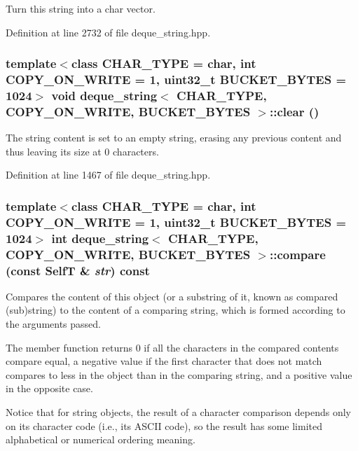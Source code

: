 Turn this string into a char vector. 

Definition at line 2732 of file deque\_\-string.hpp.\hypertarget{classdeque__string_4ee86cce5b0bdf35309bcdf0e1cee4e5}{
\subsubsection[{clear}]{\setlength{\rightskip}{0pt plus 5cm}template$<$class CHAR\_\-TYPE  = char, int COPY\_\-ON\_\-WRITE = 1, uint32\_\-t BUCKET\_\-BYTES = 1024$>$ void {\bf deque\_\-string}$<$ CHAR\_\-TYPE, COPY\_\-ON\_\-WRITE, BUCKET\_\-BYTES $>$::clear ()}}
\label{classdeque__string_4ee86cce5b0bdf35309bcdf0e1cee4e5}


The string content is set to an empty string, erasing any previous content and thus leaving its size at 0 characters. 

Definition at line 1467 of file deque\_\-string.hpp.\hypertarget{classdeque__string_703af7d90146d6f0589d5a778e488ebf}{
\subsubsection[{compare}]{\setlength{\rightskip}{0pt plus 5cm}template$<$class CHAR\_\-TYPE  = char, int COPY\_\-ON\_\-WRITE = 1, uint32\_\-t BUCKET\_\-BYTES = 1024$>$ int {\bf deque\_\-string}$<$ CHAR\_\-TYPE, COPY\_\-ON\_\-WRITE, BUCKET\_\-BYTES $>$::compare (const {\bf SelfT} \& {\em str}) const}}
\label{classdeque__string_703af7d90146d6f0589d5a778e488ebf}


Compares the content of this object (or a substring of it, known as compared (sub)string) to the content of a comparing string, which is formed according to the arguments passed.

The member function returns 0 if all the characters in the compared contents compare equal, a negative value if the first character that does not match compares to less in the object than in the comparing string, and a positive value in the opposite case.

Notice that for string objects, the result of a character comparison depends only on its character code (i.e., its ASCII code), so the result has some limited alphabetical or numerical ordering meaning.


